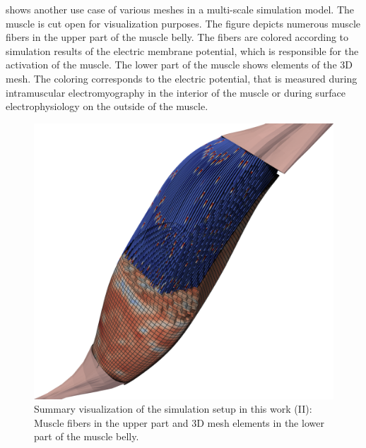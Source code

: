  shows another use case of various meshes in a multi-scale simulation model. The muscle is cut open for visualization purposes. The figure depicts numerous muscle fibers in the upper part of the muscle belly. The fibers are colored according to simulation results of the electric membrane potential, which  is responsible for the activation of the muscle. The lower part of the muscle shows elements of the 3D mesh. The coloring corresponds to the electric potential, that is measured during intramuscular electromyography in the interior of the muscle or during surface electrophysiology on the outside of the muscle.

\begin{figure}
  \centering%
  \includegraphics[width=\textwidth]{images/parallel_fiber_estimation/muscle_meshes_raytrace.png}%
  \caption{Summary visualization of the simulation setup in this work (II): Muscle fibers in the upper part and 3D mesh elements in the lower part of the muscle belly.}%
  \label{fig:muscle_meshes_raytrace}%
\end{figure}
\clearpage





